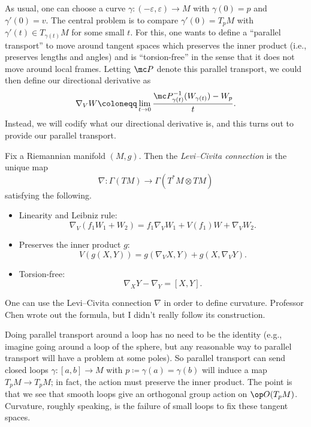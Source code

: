 \documentclass[../notes.tex]{subfiles}
\begin{document}
As usual, one can choose a curve $\gamma\colon(-\varepsilon,\varepsilon)\to M$ with $\gamma(0)=p$ and $\gamma'(0)=v$. The central problem is to compare $\gamma'(0)=T_pM$ with $\gamma'(t)\in T_{\gamma(t)}M$ for some small $t$. For this, one wants to define a ``parallel transport'' to move around tangent spaces which preserves the inner product (i.e., preserves lengths and angles) and is ``torsion-free'' in the sense that it does not move around local frames. Letting $\mc P$ denote this parallel transport, we could then define our directional derivative as
\[\nabla_VW\coloneqq\lim_{t\to0}\frac{\mc P_{\gamma(t)}^{-1}(W_{\gamma(t)})-W_p}{t}.\]
Instead, we will codify what our directional derivative is, and this turns out to provide our parallel transport.
\begin{definition}
	Fix a Riemannian manifold $(M,g)$. Then the \textit{Levi--Civita connection} is the unique map
	\[\nabla\colon\Gamma(TM)\to\Gamma(T^*M\otimes TM)\]
	satisfying the following.
	\begin{itemize}
		\item Linearity and Leibniz rule:
		\[\nabla_V(f_1W_1+W_2)=f_1\nabla_VW_1+V(f_1)W+\nabla_VW_2.\]
		\item Preserves the inner product $g$:
		\[V(g(X,Y))=g(\nabla_VX,Y)+g(X,\nabla_VY).\]
		\item Torsion-free:
		\[\nabla_XY-\nabla_Y=[X,Y].\]
	\end{itemize}
\end{definition}
\begin{remark}
	One can use the Levi--Civita connection $\nabla$ in order to define curvature. Professor Chen wrote out the formula, but I didn't really follow its construction.
\end{remark}
\begin{remark}
	Doing parallel transport around a loop has no need to be the identity (e.g., imagine going around a loop of the sphere, but any reasonable way to parallel transport will have a problem at some poles). So parallel transport can send closed loops $\gamma\colon[a,b]\to M$ with $p\coloneqq\gamma(a)=\gamma(b)$ will induce a map $T_pM\to T_pM$; in fact, the action must preserve the inner product. The point is that we see that smooth loops give an orthogonal group action on $\op O(T_pM)$. Curvature, roughly speaking, is the failure of small loops to fix these tangent spaces.
\end{remark}
\end{document}
